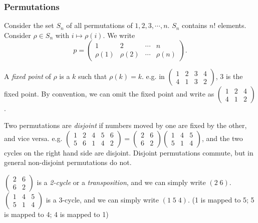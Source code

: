 \documentclass[a4paper]{article}
\begin{document}
\subsubsection{Permutations}

\begin{notation}
  Consider the set $S_n$ of all permutations of $1, 2, 3, \cdots , n$. $S_n$ contains $n!$ elements. Consider $\rho\in S_n$ with $i \mapsto \rho(i)$. We write
\[
p = \begin{pmatrix} 1 & 2 & \cdots & n\\ \rho(1) & \rho (2) &\cdots & \rho (n)\end{pmatrix}.
\]
\end{notation}

\begin{defi}
  A \emph{fixed point} of $\rho$ is a $k$ such that $\rho(k) = k$. e.g. in $\begin{pmatrix} 1 & 2 & 3 & 4\\4 & 1 & 3 & 2\end{pmatrix}$, $3$ is the fixed point. By convention, we can omit the fixed point and write as $\begin{pmatrix} 1 & 2 & 4\\ 4 & 1 & 2\end{pmatrix}$.
\end{defi}

\begin{defi}
  Two permutations are \emph{disjoint} if numbers moved by one are fixed by the other, and vice versa.  e.g. $\begin{pmatrix} 1 & 2 & 4 & 5 & 6\\ 5 & 6 & 1 & 4 & 2\end{pmatrix} = \begin{pmatrix}2 & 6\\ 6& 2\end{pmatrix}\begin{pmatrix}1 & 4 & 5\\5 & 1 & 4\end{pmatrix}$, and the two cycles on the right hand side are disjoint. Disjoint permutations commute, but in general non-disjoint permutations do not.
\end{defi}

\begin{defi}
  $\begin{pmatrix} 2 & 6 \\ 6 & 2\end{pmatrix}$ is a \emph{2-cycle} or a \emph{transposition}, and we can simply write $(2\; 6)$. $\begin{pmatrix}1 & 4 & 5\\5 & 1 & 4\end{pmatrix}$ is a 3-cycle, and we can simply write $(1\; 5\; 4)$. (1 is mapped to 5; 5 is mapped to 4; 4 is mapped to 1)
\end{defi}
\end{document}
